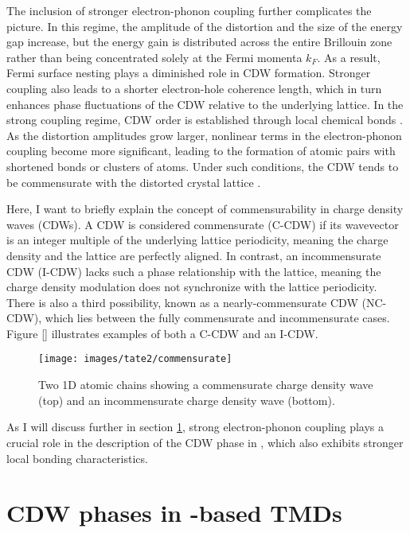The inclusion of stronger electron-phonon coupling further complicates the picture.
In this regime, the amplitude of the distortion and the size of the energy gap increase, but the energy gain is distributed across the entire Brillouin zone rather than being concentrated solely at the Fermi momenta $k_F$.
As a result, Fermi surface nesting plays a diminished role in CDW formation.
Stronger coupling also leads to a shorter electron-hole coherence length, which in turn enhances phase fluctuations of the CDW relative to the underlying lattice.
In the strong coupling regime, CDW order is established through local chemical bonds \cite{rossnagel_origin_2011, whangbo_analogies_1992, mcmillan_microscopic_1977, haas_chemical_1978, inglesfield_bonding_1980}.
As the distortion amplitudes grow larger, nonlinear terms in the electron-phonon coupling become more significant, leading to the formation of atomic pairs with shortened bonds or clusters of atoms.
Under such conditions, the CDW tends to be commensurate with the distorted crystal lattice \cite{rossnagel_origin_2011}.

Here, I want to briefly explain the concept of commensurability in charge density waves (CDWs).
A CDW is considered commensurate (C-CDW) if its wavevector is an integer multiple of the underlying lattice periodicity, meaning the charge density and the lattice are perfectly aligned.
In contrast, an incommensurate CDW (I-CDW) lacks such a phase relationship with the lattice, meaning the charge density modulation does not synchronize with the lattice periodicity.
There is also a third possibility, known as a nearly-commensurate CDW (NC-CDW), which lies between the fully commensurate and incommensurate cases. Figure \ref{} illustrates examples of both a C-CDW and an I-CDW.

\begin{figure}
	\centering
	\texttt{[image: images/tate2/commensurate]}
	\caption{Two 1D atomic chains showing a commensurate charge density wave (top) and an incommensurate charge density wave (bottom).}
	\label{fig:commensurate.pdf}
\end{figure}

As I will discuss further in section \ref{sec:cdw_tate2}, strong electron-phonon coupling plays a crucial role in the description of the CDW phase in , which also exhibits stronger local bonding characteristics.

\section{CDW phases in -based TMDs}
\label{sec:cdw_tate2}

